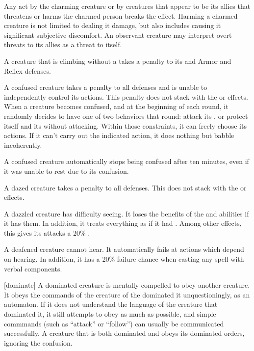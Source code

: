     Any act by the charming creature or by creatures that appear to be its allies that threatens or harms the charmed person breaks the effect.
    Harming a charmed creature is not limited to dealing it damage, but also includes causing it significant subjective discomfort.
    An observant creature may interpret overt threats to its allies as a threat to itself.

     A creature that is climbing without a  takes a  penalty to its  and Armor and Reflex defenses.

     A confused creature takes a  penalty to all defenses and is unable to independently control its actions.
    This penalty does not stack with the \dazed or \stunned effects.
    When a creature becomes confused, and at the beginning of each round, it randomly decides to have one of two behaviors that round: attack its , or protect itself and its  without attacking.
    Within those constraints, it can freely choose its actions.
    If it can't carry out the indicated action, it does nothing but babble incoherently.

    A confused creature automatically stops being confused after ten minutes, even if it was unable to rest due to its confusion.

     A dazed creature takes a  penalty to all defenses.
    This does not stack with the \stunned or \confused effects.

     A dazzled creature has difficulty seeing.
    It loses the benefits of the  and  abilities if it has them.
    In addition, it treats everything as if it had .
    Among other effects, this gives its  attacks a 20\% .

     A deafened creature cannot hear. It automatically fails at actions which depend on hearing. In addition, it has a 20\% failure chance when casting any spell with verbal components.

    [dominate] A dominated creature is mentally compelled to obey another creature.
    It obeys the commands of the creature of the dominated it unquestioningly, as an automaton.
    If it does not understand the language of the creature that dominated it, it still attempts to obey as much as possible, and simple commmands (such as ``attack'' or ``follow'') can usually be communicated successfully.
    A creature that is both dominated and \confused obeys its dominated orders, ignoring the confusion.

